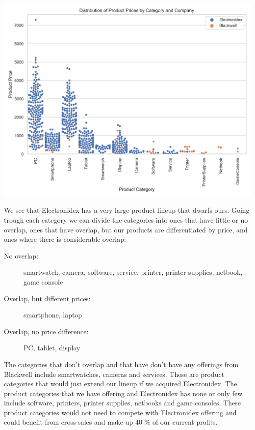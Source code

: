 \documentclass[12pt,a4paper,leqno]{report}
\theoremstyle{plain}
\theoremstyle{definition}
\theoremstyle{remark}
\begin{document}
\bigskip
{
    \centering
    \includegraphics[width=\textwidth,height=\textheight,keepaspectratio]{product_prices_distribution_by_category_and_company.png}
    \par
}
\bigskip

We see that Electronidex has a very large product lineup that dwarfs ours.
Going trough each category we can divide the categories into ones that have little or no overlap, ones that have overlap,
but our products are differentiated by price, and ones where there is considerable overlap:

\begin{description}
   \item [No overlap:] smartwatch, camera, software, service, printer, printer supplies, netbook, game console
   \item [Overlap, but different prices:] smartphone, laptop
   \item [Overlap, no price difference:] PC, tablet, display
\end{description}

The categories that don't overlap and that have don't have any offerings from Blackwell include smartwatches, cameras
and services. These are product categories that would just extend our lineup if we acquired Electronidex.
The product categories that we have offering and Electronidex has none or only few include software, printers,
printer supplies, netbooks and game consoles. These product categories would not need to compete with Electronidex
offering and could benefit from cross-sales and make up 40 \% of our current profits.
\end{document}
